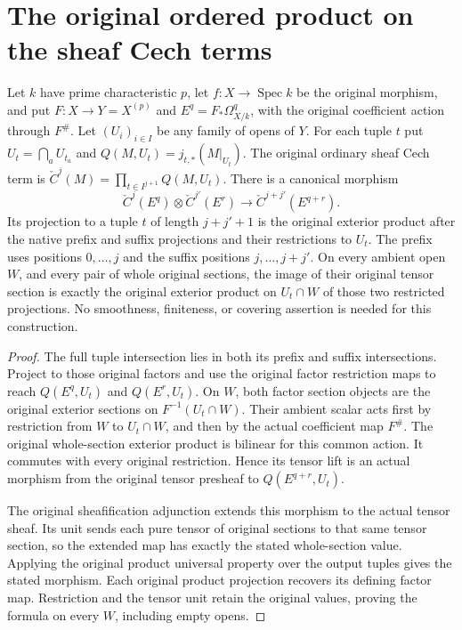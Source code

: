 \section{The original ordered product on the sheaf Cech terms}

\begin{definition}
\label{def:native-cech-ordered-cup}
\leanok
{}
Let $k$ have prime characteristic $p$, let $f:X\to\operatorname{Spec}k$
be the original morphism, and put $F:X\to Y=X^{(p)}$ and
$E^q=F_*\Omega^q_{X/k}$, with the original coefficient action through
$F^\#$. Let $(U_i)_{i\in I}$ be any family of opens of $Y$.
For each tuple $t$ put $U_t=\bigcap_a U_{t_a}$ and
$Q(M,U_t)=j_{t,*}(M|_{U_t})$. The original ordinary sheaf Cech term is
$\check C^j(M)=\prod_{t\in I^{j+1}}Q(M,U_t)$.
There is a canonical morphism
\[
 \check C^j(E^q)\otimes\check C^{j'}(E^r)
       \longrightarrow\check C^{j+j'}(E^{q+r}).
\]
Its projection to a tuple $t$ of length $j+j'+1$ is the original
exterior product after the native prefix and suffix projections
and their restrictions to $U_t$. The prefix uses positions
$0,\ldots,j$ and the suffix positions $j,\ldots,j+j'$.
On every ambient open $W$, and every pair of whole original sections,
the image of their original tensor section is exactly the original
exterior product on $U_t\cap W$ of those two restricted projections.
No smoothness, finiteness, or covering assertion is needed for this
construction.
\end{definition}
\begin{proof}
The full tuple intersection lies in both its prefix and suffix
intersections. Project to those original factors and use the original
factor restriction maps to reach $Q(E^q,U_t)$ and $Q(E^r,U_t)$.
On $W$, both factor section objects are the original exterior
sections on $F^{-1}(U_t\cap W)$. Their ambient scalar acts first
by restriction from $W$ to $U_t\cap W$, and then by the actual
coefficient map $F^\#$. The original whole-section exterior product
is bilinear for this common action. It commutes with every original
restriction. Hence its tensor lift is an actual morphism from the
original tensor presheaf to $Q(E^{q+r},U_t)$.

The original sheafification adjunction extends this morphism to the
actual tensor sheaf. Its unit sends each pure tensor of original
sections to that same tensor section, so the extended map has
exactly the stated whole-section value. Applying the original
product universal property over the output tuples gives the stated
morphism. Each original product projection recovers its defining
factor map. Restriction and the tensor unit retain the original
values, proving the formula on every $W$, including empty opens.
\end{proof}
